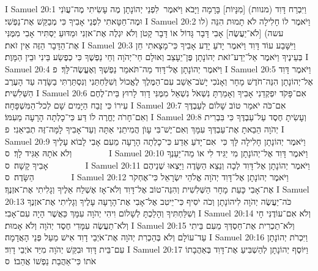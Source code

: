I Samuel 20:1	וַיִּבְרַח דָּוִד (מנוות) [מִנָּיוֹת] בָּרָמָה וַיָּבֹא וַיֹּאמֶר  לִפְנֵי יְהוֹנָתָן מֶה עָשִׂיתִי מֶה־עֲוֺנִי וּמֶה־חַטָּאתִי לִפְנֵי אָבִיךָ כִּי מְבַקֵּשׁ אֶת־נַפְשִׁי׃
I Samuel 20:2	וַיֹּאמֶר לוֹ חָלִילָה לֹא תָמוּת הִנֵּה (לו עשה) [לֹא־יַעֲשֶׂה] אָבִי דָּבָר גָּדוֹל אוֹ דָּבָר קָטֹן וְלֹא יִגְלֶה אֶת־אזְנִי וּמַדּוּעַ יַסְתִּיר אָבִי מִמֶּנִּי אֶת־הַדָּבָר הַזֶּה אֵין זֹאת׃
I Samuel 20:3	וַיִּשָּׁבַע עוֹד דָּוִד וַיֹּאמֶר יָדֹעַ יָדַע אָבִיךָ כִּי־מָצָאתִי חֵן בְּעֵינֶיךָ וַיֹּאמֶר אַל־יֵדַע־זֹאת יְהוֹנָתָן פֶּן־יֵעָצֵב וְאוּלָם חַי־יְהֹוָה וְחֵי נַפְשֶׁךָ כִּי כְפֶשַׂע בֵּינִי וּבֵין הַמָּוֶת׃
I Samuel 20:4	וַיֹּאמֶר יְהוֹנָתָן אֶל־דָּוִד מַה־תֹּאמַר נַפְשְׁךָ וְאֶעֱשֶׂה־לָּךְ׃ {פ}
I Samuel 20:5	וַיֹּאמֶר דָּוִד אֶל־יְהוֹנָתָן הִנֵּה־חֹדֶשׁ מָחָר וְאָנֹכִי יָשֹׁב־אֵשֵׁב עִם־הַמֶּלֶךְ לֶאֱכוֹל וְשִׁלַּחְתַּנִי וְנִסְתַּרְתִּי בַשָּׂדֶה עַד הָעֶרֶב הַשְּׁלִשִׁית׃
I Samuel 20:6	אִם־פָּקֹד יִפְקְדֵנִי אָבִיךָ וְאָמַרְתָּ נִשְׁאֹל נִשְׁאַל מִמֶּנִּי דָוִד לָרוּץ בֵּית־לֶחֶם עִירוֹ כִּי זֶבַח הַיָּמִים שָׁם לְכל־הַמִּשְׁפָּחָה׃
I Samuel 20:7	אִם־כֹּה יֹאמַר טוֹב שָׁלוֹם לְעַבְדֶּךָ וְאִם־חָרֹה יֶחֱרֶה לוֹ דַּע כִּי־כָלְתָה הָרָעָה מֵעִמּוֹ׃
I Samuel 20:8	וְעָשִׂיתָ חֶסֶד עַל־עַבְדֶּךָ כִּי בִּבְרִית יְהֹוָה הֵבֵאתָ אֶת־עַבְדְּךָ עִמָּךְ וְאִם־יֶשׁ־בִּי עָוֺן הֲמִיתֵנִי אַתָּה וְעַד־אָבִיךָ לָמָּה־זֶּה תְבִיאֵנִי׃ {פ}
I Samuel 20:9	וַיֹּאמֶר יְהוֹנָתָן חָלִילָה לָּךְ כִּי  אִם־יָדֹעַ אֵדַע כִּי־כָלְתָה הָרָעָה מֵעִם אָבִי לָבוֹא עָלֶיךָ וְלֹא אֹתָהּ אַגִּיד לָךְ׃ {ס}        
I Samuel 20:10	וַיֹּאמֶר דָּוִד אֶל־יְהוֹנָתָן מִי יַגִּיד לִי אוֹ מַה־יַּעַנְךָ אָבִיךָ קָשָׁה׃ {ס}        
I Samuel 20:11	וַיֹּאמֶר יְהוֹנָתָן אֶל־דָּוִד לְכָה וְנֵצֵא הַשָּׂדֶה וַיֵּצְאוּ שְׁנֵיהֶם הַשָּׂדֶה׃ {ס}        
I Samuel 20:12	וַיֹּאמֶר יְהוֹנָתָן אֶל־דָּוִד יְהֹוָה אֱלֹהֵי יִשְׂרָאֵל כִּי־אֶחְקֹר אֶת־אָבִי כָּעֵת  מָחָר הַשְּׁלִשִׁית וְהִנֵּה־טוֹב אֶל־דָּוִד וְלֹא־אָז אֶשְׁלַח אֵלֶיךָ וְגָלִיתִי אֶת־אזְנֶךָ׃
I Samuel 20:13	כֹּה־יַעֲשֶׂה יְהֹוָה לִיהוֹנָתָן וְכֹה יֹסִיף כִּי־יֵיטִב אֶל־אָבִי אֶת־הָרָעָה עָלֶיךָ וְגָלִיתִי אֶת־אזְנֶךָ וְשִׁלַּחְתִּיךָ וְהָלַכְתָּ לְשָׁלוֹם וִיהִי יְהֹוָה עִמָּךְ כַּאֲשֶׁר הָיָה עִם־אָבִי׃
I Samuel 20:14	וְלֹא אִם־עוֹדֶנִּי חָי וְלֹא־תַעֲשֶׂה עִמָּדִי חֶסֶד יְהֹוָה וְלֹא אָמוּת׃
I Samuel 20:15	וְלֹא־תַכְרִית אֶת־חַסְדְּךָ מֵעִם בֵּיתִי עַד־עוֹלָם וְלֹא בְּהַכְרִת יְהֹוָה אֶת־אֹיְבֵי דָוִד אִישׁ מֵעַל פְּנֵי הָאֲדָמָה׃
I Samuel 20:16	וַיִּכְרֹת יְהוֹנָתָן עִם־בֵּית דָּוִד וּבִקֵּשׁ יְהֹוָה מִיַּד אֹיְבֵי דָוִד׃
I Samuel 20:17	וַיּוֹסֶף יְהוֹנָתָן לְהַשְׁבִּיעַ אֶת־דָּוִד בְּאַהֲבָתוֹ אֹתוֹ כִּי־אַהֲבַת נַפְשׁוֹ אֲהֵבוֹ׃ {ס}        
